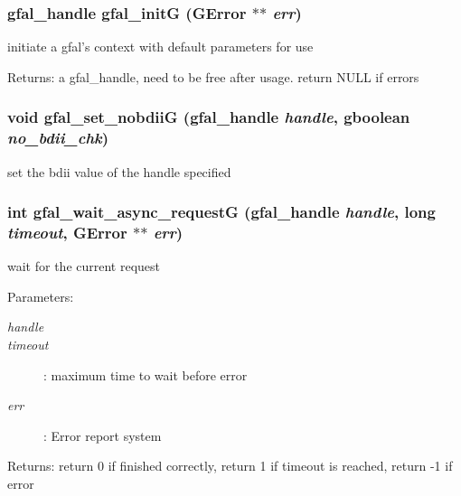 \subsubsection{\setlength{\rightskip}{0pt plus 5cm}gfal\_\-handle gfal\_\-init\-G (GError $\ast$$\ast$ {\em err})}\label{gfal__common__srm_8h_8410ba458f920d8f8a8f0e5594170fe4}


initiate a gfal's context with default parameters for use \begin{Desc}
\item[Returns:]a gfal\_\-handle, need to be free after usage. return NULL if errors \end{Desc}
\subsubsection{\setlength{\rightskip}{0pt plus 5cm}void gfal\_\-set\_\-nobdii\-G (gfal\_\-handle {\em handle}, gboolean {\em no\_\-bdii\_\-chk})}\label{gfal__common__srm_8h_a3975dda72e623713566e510b0317796}


set the bdii value of the handle specified 
\subsubsection{\setlength{\rightskip}{0pt plus 5cm}int gfal\_\-wait\_\-async\_\-request\-G (gfal\_\-handle {\em handle}, long {\em timeout}, GError $\ast$$\ast$ {\em err})}\label{gfal__common__srm_8h_86890a00f72d9af9ab88f42a69e3bf8c}


wait for the current request 

\begin{Desc}
\item[Parameters:]
\begin{description}
\item[{\em handle}]\item[{\em timeout}]: maximum time to wait before error \item[{\em err}]: Error report system \end{description}
\end{Desc}
\begin{Desc}
\item[Returns:]return 0 if finished correctly, return 1 if timeout is reached, return -1 if error \end{Desc}
